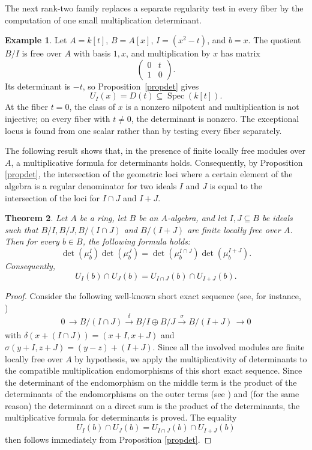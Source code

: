 \documentclass[11pt,leqno]{amsart}
\newcommand{\aar}[2][]{\xrightarrow[#1]{#2}}
\newtheorem{theorem}{Theorem}[section]
\theoremstyle{definition}
\newtheorem{example}[theorem]{Example}
\numberwithin{equation}{section}
\DeclareMathOperator{\Spec}{Spec}
\begin{document}
The next rank-two family replaces a separate regularity test in every fiber by the computation of one small multiplication determinant.

\begin{example}
Let $A=k[t]$, $B=A[x]$, $I=(x^2-t)$, and $b=x$. The quotient $B/I$ is free over $A$ with basis $1,x$, and multiplication by $x$ has matrix
\[
\begin{pmatrix}0&t\\1&0\end{pmatrix}.
\]
Its determinant is $-t$, so Proposition~\ref{propdet} gives
\[
U_I(x)=D(t)\subseteq\Spec(k[t]).
\]
At the fiber $t=0$, the class of $x$ is a nonzero nilpotent and multiplication is not injective; on every fiber with $t\ne0$, the determinant is nonzero. The exceptional locus is found from one scalar rather than by testing every fiber separately.
\end{example}

The following result shows that, in the presence of finite locally free modules over $A$, a multiplicative formula for determinants holds. Consequently, by Proposition \ref{propdet}, the intersection of the geometric loci where a certain element of the algebra is a regular denominator for two ideals $I$ and $J$ is equal to the intersection of the loci for $I\cap J$ and $I+J$. 

\begin{theorem}\label{detthm}
    Let $A$ be a ring, let $B$ be an $A$-algebra, and let $I,J\subseteq B$ be ideals such that $B/I,B/J,B/(I\cap J)$ and $B/(I+J)$ are finite locally free over $A$. Then for every $b\in B$, the following formula holds:
\begin{equation*}
\det(\mu_b^I)\det(\mu_b^J)=\det(\mu_b^{I\cap J})\det(\mu_b^{I+J}).
\end{equation*}
Consequently,
\begin{equation*}
\label{eq:family-open-equality}
U_I(b)\cap U_J(b)=U_{I\cap J}(b)\cap U_{I+J}(b).
\end{equation*}
\end{theorem}
\begin{proof}
    Consider the following well-known short exact sequence (see, for instance, 
    \cite[Chapter~II, \S1(7), Proposition~10]{Bou89})
    $$0\, \aar{} B/(I\cap J) \aar{\delta} {B/I \oplus B/J} \aar{\sigma} B/(I+J)\, \aar{} 0$$
    with $\delta(x+(I\cap J))=(x+I, x+J)$ and $\sigma (y+I,z+J)=(y-z)+(I+J)$. Since all the involved modules are finite locally free over $A$ by hypothesis, we apply the multiplicativity of determinants to the compatible multiplication endomorphisms of this short exact sequence. Since the determinant of the endomorphism on the middle term is the product of the determinants of the endomorphisms on the outer terms (see \cite[\S1]{KM76}) and (for the same reason) the determinant on a direct sum is the product of the determinants, the multiplicative formula for determinants is proved. The equality  
    $$U_I(b)\cap U_J(b)=U_{I\cap J}(b)\cap U_{I+J}(b)$$ 
    then follows immediately from Proposition \ref{propdet}.
\end{proof}
\end{document}
